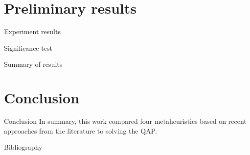 \section{Preliminary results} {
    \begin{frame}{Experiment results}

    \end{frame}

    \begin{frame}{Significance test}

    \end{frame}

    \begin{frame}{Summary of results}

    \end{frame}
}

\section{Conclusion} {
    \begin{frame}{Conclusion}
        In summary, this work compared four metaheuristics based on recent approaches from the literature to solving the QAP.

    \end{frame}

    \begin{frame}{Bibliography}
      \vspace{-2em}
      
      \fontsize{0.5em}{0.5em}\selectfont
      
    \end{frame}

}


